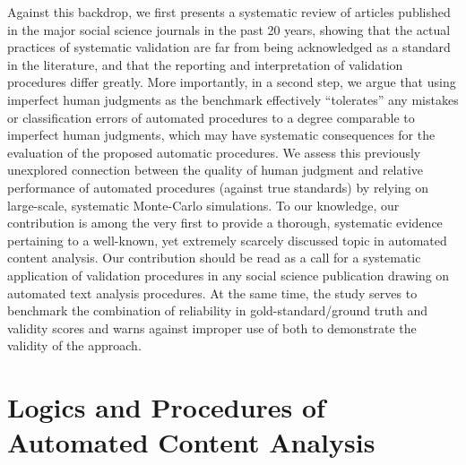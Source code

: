 \documentclass[man, 12pt, a4paper, nolmodern, noextraspace]{apa6}
\begin{document}
    Against this backdrop, we first presents a systematic review of articles published in the major social science journals in the past 20 years, showing that the actual practices of systematic validation are far from being acknowledged as a standard in the literature, and that the reporting and interpretation of validation procedures differ greatly. More importantly, in a second step, we argue that using imperfect human judgments as the benchmark effectively \enquote{tolerates} any mistakes or classification errors of automated procedures to a degree comparable to imperfect human judgments, which may have systematic consequences for the evaluation of the proposed automatic procedures. We assess this previously unexplored connection between the quality of human judgment and relative performance of automated procedures (against true standards) by relying on large-scale, systematic Monte-Carlo simulations. To our knowledge, our contribution is among the very first to provide a thorough, systematic evidence pertaining to a well-known, yet extremely scarcely discussed topic in automated content analysis. Our contribution should be read as a call for a systematic application of validation procedures in any social science publication drawing on automated text analysis procedures. At the same time, the study serves to benchmark the combination of reliability in gold-standard/ground truth and validity scores and warns against improper use of both to demonstrate the validity of the approach. 
    
\section{Logics and Procedures of Automated Content Analysis}
\end{document}
